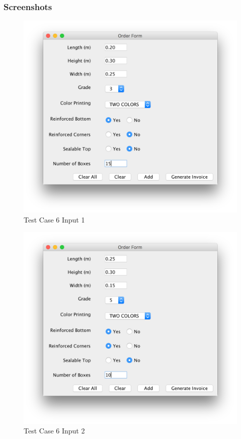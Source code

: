 \documentclass[12pt]{article}
\begin{document}
\subsubsection{Screenshots}
\begin{figure}[H]
	\includegraphics[width=\linewidth]{./screenshots/test_case_6_order1_input.png}
	\caption{Test Case 6 Input 1}
	\label{test_case_6_input_1}
\end{figure}
\begin{figure}[H]
	\includegraphics[width=\linewidth]{./screenshots/test_case_6_order2_input.png}
	\caption{Test Case 6 Input 2}
	\label{test_case_6_input_2}
\end{figure}
\end{document}
